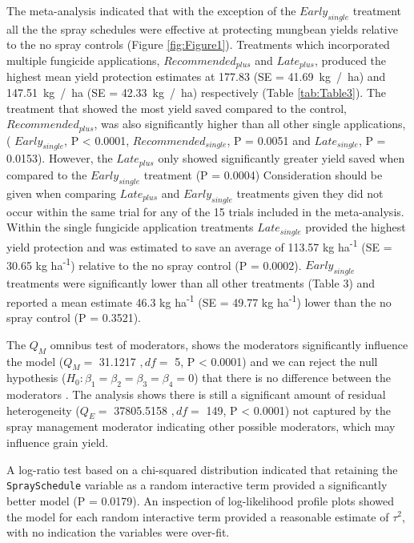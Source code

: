 \documentclass[agronomy,article,submit,moreauthors,pdftex]{mdpi}
\begin{document}
The meta-analysis indicated that with the exception of the \(Early_{single}\) treatment all the the spray schedules were effective at protecting mungbean yields relative to the no spray controls (Figure \ref{fig:Figure1}).
Treatments which incorporated multiple fungicide applications, \(Recommended_{plus}\) and \(Late_{plus}\), produced the highest mean yield protection estimates at 177.83 (SE = 41.69~kg~/~ha) and 147.51~kg~/~ha (SE = 42.33~kg~/~ha) respectively (Table \ref{tab:Table3}).
The treatment that showed the most yield saved compared to the control, \(Recommended_{plus}\), was also significantly higher than all other single applications, (
\(Early_{single}\), P \textless{} 0.0001,
\(Recommended_{single}\), P = 0.0051 and
\(Late_{single}\), P = 0.0153).
However, the \(Late_{plus}\) only showed significantly greater yield saved when compared to the \(Early_{single}\) treatment (P = 0.0004)
Consideration should be given when comparing \(Late_{plus}\) and \(Early_{single}\) treatments given they did not occur within the same trial for any of the 15 trials included in the meta-analysis.
Within the single fungicide application treatments \(Late_{single}\) provided the highest yield protection and was estimated to save an average of 113.57 kg ha\textsuperscript{-1} (SE = 30.65 kg ha\textsuperscript{-1}) relative to the no spray control (P = 0.0002).
\(Early_{single}\) treatments were significantly lower than all other treatments (Table 3) and reported a mean estimate 46.3 kg ha\textsuperscript{-1} (SE = 49.77 kg ha\textsuperscript{-1}) lower than the no spray control (P = 0.3521).

The \(Q_M\) omnibus test of moderators, shows the moderators significantly influence the model (\(Q_M =\) 31.1217 \(,df =\) 5, P \textless{} 0.0001) and we can reject the null hypothesis (\(H_0 : \beta_1 = \beta_2 = \beta_3 =\beta_4 = 0\)) that there is no difference between the moderators \citep{Viechtbauer2010}.
The analysis shows there is still a significant amount of residual heterogeneity (\(Q_E =\) 37805.5158 \(,df=\) 149, P \textless{} 0.0001) not captured by the spray management moderator indicating other possible moderators, which may influence grain yield.

A log-ratio test based on a chi-squared distribution indicated that retaining the \texttt{SpraySchedule} variable as a random interactive term provided a significantly better model (P = 0.0179).
An inspection of log-likelihood profile plots showed the model for each random interactive term provided a reasonable estimate of \(\tau^2\), with no indication the variables were over-fit.
\end{document}
